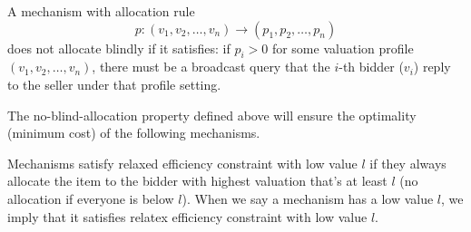 
\begin{definition}\label{def:allocation_cost}
A mechanism with allocation rule $$p: (v_1, v_2, \ldots, v_n) \rightarrow
(p_1, p_2, \ldots, p_n)$$ does not allocate blindly if it satisfies: if $p_i >
0$ for some valuation profile $(v_1, v_2, \ldots, v_n)$, there must be a
broadcast query that the $i$-th bidder ($v_i$) reply to the seller
under that profile setting.
\end{definition}

The no-blind-allocation property defined above will ensure the optimality
(minimum cost) of the following mechanisms.

\begin{definition}

Mechanisms satisfy relaxed efficiency constraint with low value $l$
if they always allocate the item to the bidder with highest valuation that's
at least $l$ (no allocation if everyone is below $l$).
%
%
%
%
%
When we say a mechanism has a low value $l$, we imply that it
satisfies relatex efficiency constraint with low value $l$.

\end{definition}

